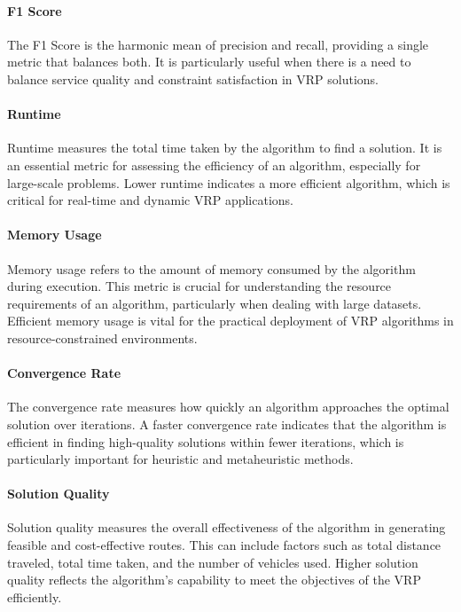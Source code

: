 \documentclass[
]{article}
\begin{document}
    \paragraph{F1 Score} The F1 Score is the harmonic mean of precision and recall, providing a single metric that balances both. It is particularly useful when there is a need to balance service quality and constraint satisfaction in VRP solutions.

    \paragraph{Runtime} Runtime measures the total time taken by the algorithm to find a solution. It is an essential metric for assessing the efficiency of an algorithm, especially for large-scale problems. Lower runtime indicates a more efficient algorithm, which is critical for real-time and dynamic VRP applications.

    \paragraph{Memory Usage} Memory usage refers to the amount of memory consumed by the algorithm during execution. This metric is crucial for understanding the resource requirements of an algorithm, particularly when dealing with large datasets. Efficient memory usage is vital for the practical deployment of VRP algorithms in resource-constrained environments.

    \paragraph{Convergence Rate} The convergence rate measures how quickly an algorithm approaches the optimal solution over iterations. A faster convergence rate indicates that the algorithm is efficient in finding high-quality solutions within fewer iterations, which is particularly important for heuristic and metaheuristic methods.

    \paragraph{Solution Quality} Solution quality measures the overall effectiveness of the algorithm in generating feasible and cost-effective routes. This can include factors such as total distance traveled, total time taken, and the number of vehicles used. Higher solution quality reflects the algorithm’s capability to meet the objectives of the VRP efficiently.
\end{document}
